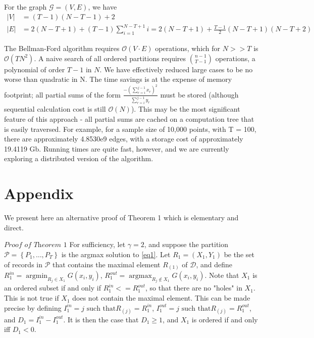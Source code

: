 \documentclass{article}
\theoremstyle{case}
\DeclareMathOperator*{\argmax}{argmax} %
\DeclareMathOperator*{\argmin}{argmin} %
\begin{document}
For the graph $\mathcal{G} = \left( V, E\right)$, we have 
\begin{align*}
\vert V \vert & = \left( T-1\right)\left(N-T-1\right) + 2 \\
\vert E \vert & = 2\left( N-T+1\right) + \left( T-1\right)\sum_{i=1}^{N-T+1} i = 2\left( N-T+1\right) + \frac{T-1}{2}\left( N-T+1\right)\left( N-T+2\right)
\end{align*}

The Bellman-Ford algorithm requires $\mathcal{O}\left( V\cdot E\right)$ operations, which for $N >> T$ is $\mathcal{O}\left( TN^2\right)$. A naive search of all ordered partitions requires $\binom{n-1}{T-1}$ operations, a polynomial of order $T-1$ in $N$. We have effectively reduced large cases to be no worse than quadratic in N. The time savings is at the expense of memory footprint; all partial sums of the form $\frac{-\left(\sum_{r=i}^{j-1} x_r\right)^2}{\sum_{r=i}^{j-1} y_r}$ must be stored (although sequential calculation cost is still $\mathcal{O}\left( N\right)$). This may be the most significant feature of this approach - all partial sums are cached on a computation tree that is easily traversed. For example, for a sample size of 10,000 points, with T = 100, there are approximately 4.8530e9 edges, with a storage cost of approximately 19.4119 Gb. Running times are quite fast, however, and we are currently exploring a distributed version of the algorithm.

\cleardoublepage
\appendix
\section{Appendix}
We present here an alternative proof of Theorem 1 which is elementary and direct.

\vspace{6pt}

$\textit{Proof of Theorem 1}$
For sufficiency, let $\gamma = 2$, and suppose the partition $\mathcal{P} = \left\lbrace P_1, \dots, P_T\right\rbrace$ is the argmax solution to \ref{eq1}. Let $R_1 = (X_1, Y_1)$ be the set of records in $\mathcal{P}$ that contains the maximal element $R_{(1)}$ of $\mathcal{D}$, and define $R_1^{in} = \argmin_{R_j \in X_1} G(x_i, y_i)$, $R_1^{out} = \argmax_{R_j \not\in X_1} G(x_i, y_i)$. Note that $X_1$ is an ordered subset if and only if $R_1^{in} <= R_1^{out}$, so that there are no "holes" in $X_1$. This is not true if $X_1$ does not contain the maximal element. This can be made precise by defining $I_1^{in} = j \text{ such that} R_{(j)} = R_1^{in}$, $I_1^{out} = j \text{ such that} R_{(j)} = R_1^{out}$, and $D_1 = I_1^{in} - I_1^{out}$. It is then the case that $D_1 \geq 1$, and $X_1$ is ordered if and only iff $D_1 < 0$.
\end{document}
